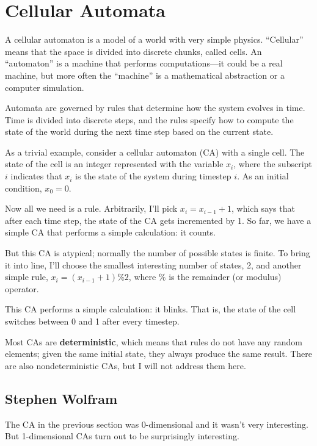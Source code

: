 \documentclass[10pt]{book}
\begin{document}
\chapter{Cellular Automata}

A cellular automaton is a model of a world with very simple physics.
``Cellular'' means that the space is divided into discrete chunks,
called cells.  An ``automaton'' is a machine that performs
computations---it could be a real machine, but more often the
``machine'' is a mathematical abstraction or a computer simulation.

Automata are governed by rules that determine how the system evolves
in time.  Time is divided into discrete steps, and the rules
specify how to compute the state of the world during the next time
step based on the current state.

As a trivial example, consider a cellular automaton (CA) with
a single cell.  The state of the cell is an integer represented
with the variable $x_i$, where the subscript $i$ indicates
that $x_i$ is the state of the system during timestep $i$.
As an initial condition, $x_0 = 0$.

Now all we need is a rule.  Arbitrarily, I'll pick $x_i = x_{i-1} + 1$,
which says that after each time step, the state of the CA gets
incremented by 1.  So far, we have a simple CA that performs
a simple calculation: it counts.

But this CA is atypical; normally the number of
possible states is finite.  To bring it into line, I'll choose the
smallest interesting number of states, 2, and another simple rule,
$x_i = (x_{i-1} + 1) \% 2$, where $\%$ is the remainder (or
modulus) operator.

This CA performs a simple calculation: it blinks.  That is,
the state of the cell switches between 0 and 1 after every timestep.

Most CAs are {\bf deterministic}, which means that rules do not
have any random elements; given the same initial state, they
always produce the same result.  There are also nondeterministic
CAs, but I will not address them here.



\section{Stephen Wolfram}

The CA in the previous section was 0-dimensional and it wasn't very
interesting.  But 1-dimensional CAs turn out to be surprisingly
interesting.
\end{document}
